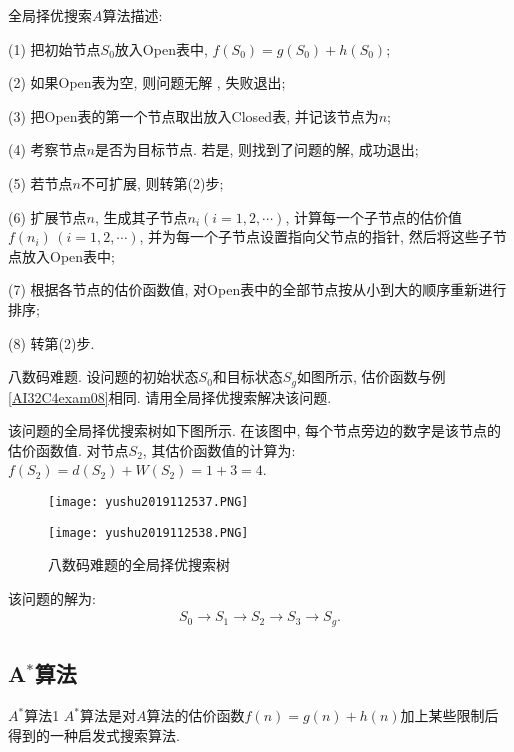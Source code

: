 全局择优搜索$A$算法描述:

\quad   (1) 把初始节点$S_0$放入Open表中, $f(S_0)=g(S_0)+h(S_0)$;

\quad   (2) 如果Open表为空, 则问题无解 , 失败退出;

\quad   (3) 把Open表的第一个节点取出放入Closed表, 并记该节点为$n$;

\quad   (4) 考察节点$n$是否为目标节点. 若是, 则找到了问题的解, 成功退出;

\quad   (5) 若节点$n$不可扩展, 则转第(2)步;

\quad   (6) 扩展节点$n$, 生成其子节点$n_i(i=1, 2,\cdots)$, 计算每一个子节点的估价值$f(n_i)\,(i=1, 2, \cdots)$, 并为每一个子节点设置指向父节点的指针, 然后将这些子节点放入Open表中;

\quad   (7) 根据各节点的估价函数值, 对Open表中的全部节点按从小到大的顺序重新进行排序;

\quad   (8) 转第(2)步.
\begin{example}
    八数码难题. 设问题的初始状态$S_0$和目标状态$S_g$如图所示, 估价函数与例\ref{AI32C4exam08}相同. 请用全局择优搜索解决该问题.
\end{example}
\begin{result}
    该问题的全局择优搜索树如下图所示. 在该图中, 每个节点旁边的数字是该节点的估价函数值.
    对节点$S_2$, 其估价函数值的计算为: $f(S_2)=d(S_2)+W(S_2) =1+3=4$.
\begin{figure}[H]
    \centering
    \texttt{[image: yushu2019112537.PNG]}
    \caption{}
    \label{AI32fig37}
\end{figure}

\begin{figure}[H]
    \centering
    \texttt{[image: yushu2019112538.PNG]}
    \caption{八数码难题的全局择优搜索树}
    \label{AI32fig38}
\end{figure}
该问题的解为:
\begin{align}
    S_0\rightarrow S_1\rightarrow S_2\rightarrow S_3\rightarrow S_g.
\end{align}
\end{result}
\subsection{A$^*$算法}
\begin{mydef}{$A^*$算法}{1}
    $A^*$算法是对$A$算法的估价函数$f(n)=g(n)+h(n)$加上某些限制后得到的一种启发式搜索算法.
\end{mydef}

